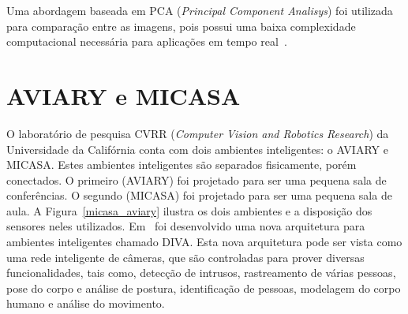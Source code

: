 Uma abordagem baseada em PCA (\textit{Principal Component Analisys}) foi utilizada para comparação entre as imagens, pois possui uma baixa complexidade computacional necessária para aplicações em tempo real~\cite{salah}.


\section{AVIARY e MICASA}


O laboratório de pesquisa CVRR (\textit{Computer Vision and Robotics Research}) da Universidade da Califórnia conta com dois ambientes inteligentes: o AVIARY e MICASA. Estes ambientes inteligentes são separados fisicamente, porém conectados. O primeiro (AVIARY) foi projetado para ser uma pequena sala de conferências. O segundo (MICASA) foi projetado para ser uma pequena sala de aula. A Figura~\ref{micasa_aviary} ilustra os dois ambientes e a disposição dos sensores neles utilizados. Em~\cite{trivedi} foi desenvolvido uma nova arquitetura para ambientes inteligentes chamado DIVA. Esta nova arquitetura pode ser vista como uma rede inteligente de câmeras, que são controladas para prover diversas funcionalidades, tais como, detecção de intrusos, rastreamento de várias pessoas, pose do corpo e análise de postura, identificação de pessoas, modelagem do corpo humano e análise do movimento.

